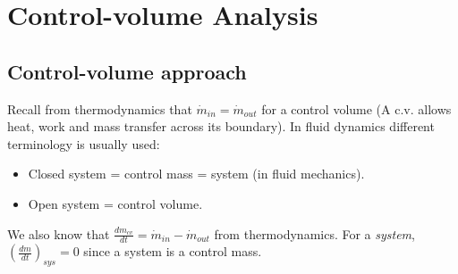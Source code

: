 \chapter{Control-volume Analysis}
\section{Control-volume approach}
Recall from thermodynamics that \(\dot{m}_{in} = \dot{m}_{out}\) for a control volume (A c.v. allows heat, work and mass transfer across its boundary). In fluid dynamics different terminology is usually used:
\begin{itemize}[noitemsep]
  \item Closed system = control mass = system (in fluid mechanics).
  \item Open system = control volume.
\end{itemize}
We also know that \(\frac{dm_{cv}}{dt} = \dot{m}_{in} - \dot{m}_{out} \) from thermodynamics. For a \emph{system}, \( \left( \frac{dm}{dt} \right)_{sys} = 0\) since a system is a control mass.
